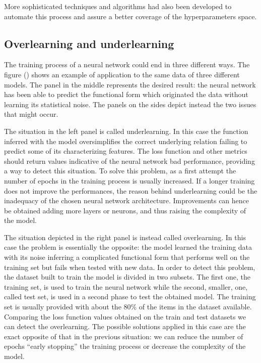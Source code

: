 \documentclass[a4paper,10pt]{report}
\begin{document}
More sophisticated techniques and algorithms had also been developed to automate this process and 
assure a better coverage of the hyperparameters space.

\subsection{Overlearning and underlearning}

The training process of a neural network could end in three different ways.
The figure () shows an example of application to the same data of three different models.
The panel in the middle represents the desired result: the neural network has been able to predict the 
functional form which originated the data without learning its statistical noise.
The panels on the sides depict instead the two issues that might occur.

The situation in the left panel is called underlearning. In this case the 
function inferred with the model oversimplifies the correct underlying relation failing 
to predict some of its characterizing features. The loss function and other metrics
should return values indicative of the neural network bad performance, providing
a way to detect this situation.
To solve this problem, as a first attempt the number of epochs in the training process is
usually increased. If a longer training does not improve the performances, the reason behind
underlearning could be the inadequacy of the chosen neural network architecture. 
Improvements can hence be obtained adding more layers or neurons, and thus raising the complexity of the model.

The situation depicted in the right panel is instead called overlearning.
In this case the problem is essentially the opposite: the model learned the training data
with its noise inferring a complicated functional form that performs
well on the training set but fails when tested with new data. In order to detect this problem,
the dataset built to train the model is divided in two subsets. The first one, the training set, is used to
train the neural network while the second, smaller, one, called test set, is used in a second phase to
test the obtained model. The training set is usually provided with about the 80\% of the items in the dataset
available.
Comparing the loss function values obtained on the train and test datasets we can
detect the overlearning. 
The possible solutions applied in this case are the exact opposite of that in the previous situation:
we can reduce the number of epochs ``early stopping'' the training process or decrease the complexity of
the model.
\end{document}
